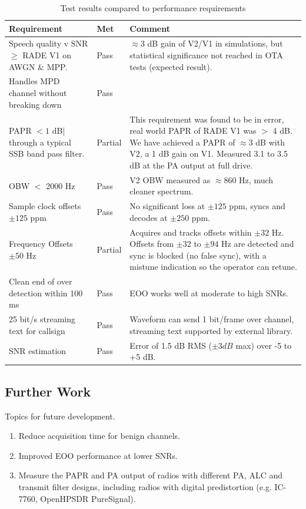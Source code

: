 \documentclass{article}
\begin{document}
\begin{table} [h]
\caption{Test results compared to performance requirements}
\label{tab:conclusion}
\centering
\begin{tabular}{ p{5cm} | p{1cm} | p{5cm}  }
\hline
Requirement & Met & Comment \\
\hline
Speech quality v SNR $\ge$ RADE V1 on AWGN \& MPP. & Pass & $\approx 3$ \si{dB} gain of V2/V1 in simulations, but statistical significance not reached in OTA tests (expected result). \\
Handles MPD channel without breaking down & Pass & \\
PAPR $< 1$ \si{dB}| through a typical SSB band pass filter. & Partial & This requirement was found to be in error, real world PAPR of RADE V1 was $>$ 4 \si{dB}.  We have achieved a PAPR of $\approx 3$ \si{dB} with V2, a 1 \si{dB} gain on V1.  Measured 3.1 to 3.5 \si{dB} at the PA output at full drive. \\
OBW $<$ 2000 \si{Hz} & Pass & V2 OBW measured as $\approx 860$ \si{Hz}, much cleaner spectrum. \\
Sample clock offsets $\pm 125$ ppm & Pass & No significant loss at $\pm 125$ ppm, syncs and decodes at $\pm 250$ ppm. \\
Frequency Offsets $\pm 50$ \si{Hz} & Partial & Acquires and tracks offsets within $\pm 32$ \si{Hz}.  Offsets from $\pm 32$ to $\pm 94$ \si{Hz} are detected and sync is blocked (no false sync), with a mistune indication so the operator can retune. \\
Clean end of over detection within 100 ms & Pass & EOO works well at moderate to high SNRs. \\
25 bit/s streaming text for callsign & Pass & Waveform can send 1 bit/frame over channel, streaming text supported by external library. \\
SNR estimation & Pass & Error of 1.5 dB RMS ($\pm 3 \si{dB}$ max) over -5 to +5 \si{dB}. \\
\hline
\end{tabular}
\end{table}

\subsection{Further Work}

Topics for future development.
\begin{enumerate}
\item Reduce acquisition time for benign channels.
\item Improved EOO performance at lower SNRs.
\item Measure the PAPR and PA output of radios with different PA, ALC and transmit filter designs, including radios with digital predistortion (e.g. IC-7760, OpenHPSDR PureSignal).
\end{enumerate}
\end{document}
